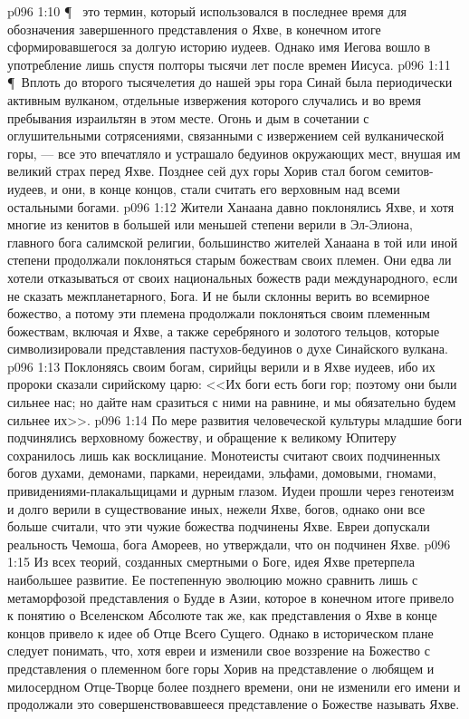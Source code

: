 \vs p096 1:10 \P\  это термин, который использовался в последнее время для обозначения завершенного представления о Яхве, в конечном итоге сформировавшегося за долгую историю иудеев. Однако имя Иегова вошло в употребление лишь спустя полторы тысячи лет после времен Иисуса.
\vs p096 1:11 \P\ Вплоть до второго тысячелетия до нашей эры гора Синай была периодически активным вулканом, отдельные извержения которого случались и во время пребывания израильтян в этом месте. Огонь и дым в сочетании с оглушительными сотрясениями, связанными с извержением сей вулканической горы, --- все это впечатляло и устрашало бедуинов окружающих мест, внушая им великий страх перед Яхве. Позднее сей дух горы Хорив стал богом семитов\hyp{}иудеев, и они, в конце концов, стали считать его верховным над всеми остальными богами.
\vs p096 1:12 Жители Ханаана давно поклонялись Яхве, и хотя многие из кенитов в большей или меньшей степени верили в Эл\hyp{}Элиона, главного бога салимской религии, большинство жителей Ханаана в той или иной степени продолжали поклоняться старым божествам своих племен. Они едва ли хотели отказываться от своих национальных божеств ради международного, если не сказать межпланетарного, Бога. И не были склонны верить во всемирное божество, а потому эти племена продолжали поклоняться своим племенным божествам, включая и Яхве, а также серебряного и золотого тельцов, которые символизировали представления пастухов\hyp{}бедуинов о духе Синайского вулкана.
\vs p096 1:13 Поклоняясь своим богам, сирийцы верили и в Яхве иудеев, ибо их пророки сказали сирийскому царю: <<Их боги есть боги гор; поэтому они были сильнее нас; но дайте нам сразиться с ними на равнине, и мы обязательно будем сильнее их>>.
\vs p096 1:14 По мере развития человеческой культуры младшие боги подчинялись верховному божеству, и обращение к великому Юпитеру сохранилось лишь как восклицание. Монотеисты считают своих подчиненных богов духами, демонами, парками, нереидами, эльфами, домовыми, гномами, привидениями\hyp{}плакальщицами и дурным глазом. Иудеи прошли через генотеизм и долго верили в существование иных, нежели Яхве, богов, однако они все больше считали, что эти чужие божества подчинены Яхве. Евреи допускали реальность Чемоша, бога Амореев, но утверждали, что он подчинен Яхве.
\vs p096 1:15 Из всех теорий, созданных смертными о Боге, идея Яхве претерпела наибольшее развитие. Ее постепенную эволюцию можно сравнить лишь с метаморфозой представления о Будде в Азии, которое в конечном итоге привело к понятию о Вселенском Абсолюте так же, как представления о Яхве в конце концов привело к идее об Отце Всего Сущего. Однако в историческом плане следует понимать, что, хотя евреи и изменили свое воззрение на Божество с представления о племенном боге горы Хорив на представление о любящем и милосердном Отце\hyp{}Творце более позднего времени, они не изменили его имени и продолжали это совершенствовавшееся представление о Божестве называть Яхве.
